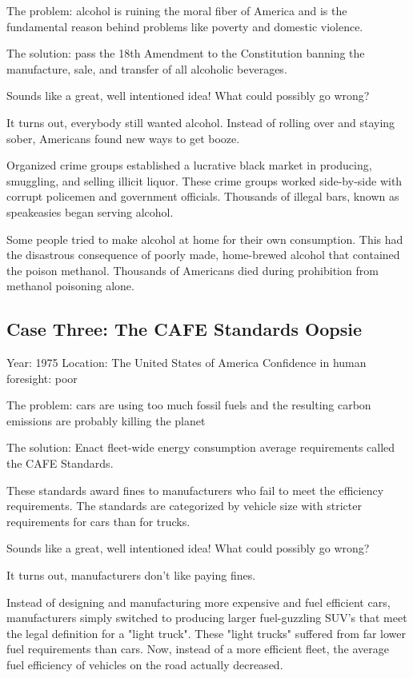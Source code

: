 \documentclass{article}
\begin{document}
The problem: alcohol is ruining the moral fiber of America and is the
fundamental reason behind problems like poverty and domestic violence.

The solution: pass the 18th Amendment to the Constitution banning the
manufacture, sale, and transfer of all alcoholic beverages.

Sounds like a great, well intentioned idea! What could possibly go wrong?

It turns out, everybody still wanted alcohol. Instead of rolling over and
staying sober, Americans found new ways to get booze.

Organized crime groups established a lucrative black market in producing,
smuggling, and selling illicit liquor. These crime groups worked side-by-side
with corrupt policemen and government officials. Thousands of illegal bars,
known as speakeasies began serving alcohol.

Some people tried to make alcohol at home for their own consumption. This had the
disastrous consequence of poorly made, home-brewed alcohol that contained the
poison methanol. Thousands of Americans died during prohibition from methanol
poisoning alone.

\subsection{Case Three: The CAFE Standards Oopsie}

Year: 1975
Location: The United States of America
Confidence in human foresight: poor

The problem: cars are using too much fossil fuels and the resulting carbon emissions
are probably killing the planet

The solution: Enact fleet-wide energy consumption average requirements called
the CAFE Standards.

These standards award fines to manufacturers who fail to meet the efficiency
requirements. The standards are categorized by vehicle size with stricter
requirements for cars than for trucks.  

Sounds like a great, well intentioned idea! What could possibly go wrong?

It turns out, manufacturers don't like paying fines. 

Instead of designing and manufacturing more expensive and fuel efficient cars,
manufacturers simply switched to producing larger fuel-guzzling SUV's that meet
the legal definition for a "light truck". These "light trucks" suffered from
far lower fuel requirements than cars. Now, instead of a more efficient fleet,
the average fuel efficiency of vehicles on the road actually decreased.
\end{document}
